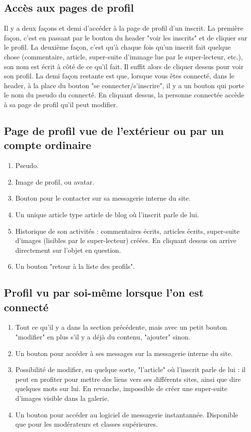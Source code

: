 \documentclass[french]{report}
\theoremstyle{plain}
\begin{document}
		\subsection{Accès aux pages de profil}
			Il y a deux façons et demi d'accéder à la page de profil d'un inscrit. La première façon, c'est en passant par le bouton du header "voir les inscrits" et de cliquer sur le profil. La deuxième façon, c'est qu'à chaque fois qu'un inscrit fait quelque chose (commentaire, article, super-suite d'immage lue par le super-lecteur, etc.), son nom est écrit à côté de ce qu'il fait. Il suffit alors de cliquer dessus pour voir son profil. La demi façon restante est que, lorsque vous êtes connecté, dans le header, à la place du bouton "se connecter/s'inscrire", il y a un bouton qui porte le nom du pseudo du connecté. En cliquant dessus, la personne connectée accède à sa page de profil qu'il peut modifier.

		\subsection{Page de profil vue de l'extérieur ou par un compte ordinaire}
			\begin{enumerate}
				\item Pseudo.
				\item Image de profil, ou avatar.
				\item Bouton pour le contacter sur sa messagerie interne du site.
				\item Un unique article type article de blog où l'inscrit parle de lui.
				\item Historique de son activités : commentaires écrits, articles écrits, super-suite d'images (lisibles par le super-lecteur) créées. En cliquant dessus on arrive directement sur l'objet en question.
				\item Un bouton "retour à la liste des profils".
			\end{enumerate}

		\subsection{Profil vu par soi-même lorsque l'on est connecté}
			\begin{enumerate}
				\item Tout ce qu'il y a dans la section précédente, mais avec un petit bouton "modifier" en plus s'il y a déjà du contenu, "ajouter" sinon.
				\item Un bouton pour accéder à ses messages sur la messagerie interne du site.
				\item Possibilité de modifier, en quelque sorte, "l'article" où l'inscrit parle de lui : il peut en profiter pour mettre des liens vers ses différents sites, ainsi que dire quelques mots sur lui. En revanche, impossible de créer une super-suite d'images visible dans la galerie.
				\item Un bouton pour accéder au logiciel de messagerie instantannée. Disponible que pour les modérateurs et classes supérieures.
			\end{enumerate}
\end{document}
